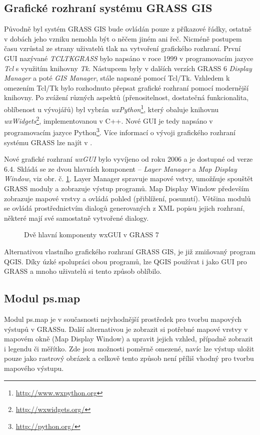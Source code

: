 \documentclass[a4paper,12pt,draft]{article}
\begin{document}
{\subsection{Grafické rozhraní systému GRASS GIS}
Původně byl systém GRASS GIS bude ovládán pouze z příkazové
řádky, ostatně v dobách jeho vzniku nemohla být o něčem jiném ani
řeč. Nicméně postupem času vzrůstal ze strany uživatelů tlak na
vytvoření grafického rozhraní. První GUI nazývané \emph{TCLTKGRASS}
bylo napsáno v roce 1999 v programovacím jazyce \emph{Tcl} s využitím
knihovny \emph{Tk}. Nástupcem byly v dalších verzích GRASS 6 \emph{Display
Manager} a poté \emph{GIS Manager}, stále napsané pomocí Tcl/Tk. Vzhledem
k omezením Tcl/Tk bylo rozhodnuto přepsat grafické rozhraní pomocí
modernější knihovny. Po zvážení různých aspektů (přenositelnost,
dostatečná funkcionalita, oblíbenost u vývojářů) 
byl vybrán \emph{wxPython}\footnote{\url{http://www.wxpython.org}}, který
obaluje knihovnu \emph{wxWidgets}\footnote{\url{http://wxwidgets.org/}},
implementovanou v C++. Nové GUI je tedy napsáno v programovacím jazyce
Python\footnote{\url{http://python.org/}}.
Více informací o vývoji grafického rozhraní systému GRASS lze najít v
\cite{wxGUI_clanek}.

Nové grafické rozhraní \emph{wxGUI} bylo vyvíjeno od roku 2006 a je
dostupné od verze 6.4. Skládá se ze dvou hlavních komponent -- \emph{Layer
Manager} a \emph{Map Display Window}, viz obr. č. \ref{fig:wxgui}. Layer
Manager spravuje mapové vstvy, umožňuje spouštět GRASS moduly a zobrazuje
výstup programů. Map Display Window především zobrazuje mapové vrstvy
a ovládá pohled (přiblížení, posunutí). Většina modulů se ovládá
prostřednictvím dialogů generovaných z XML popisu jejich rozhraní,
některé mají své samostatně vytvořené dialogy.
\begin{figure}[h!]
\centering
{}
\quad
{}
\caption{Dvě hlavní komponenty wxGUI v GRASS 7\label{fig:wxgui}}

\end{figure}

Alternativou vlastního grafického rozhraní GRASS GIS, je již zmiňovaný
program QGIS. Díky úzké spolupráci obou programů, lze QGIS používat i jako GUI
pro GRASS a mnoho uživatelů si tento způsob oblíbilo.

\subsection{Modul ps.map}
\label{sec:psmap}
Modul ps.map je v současnosti nejvhodnější prostředek pro tvorbu
mapových výstupů v GRASSu. Další alternativou je zobrazit si potřebné
mapové vrstvy v mapovém okně (Map Display Window)  a upravit jejich vzhled,
případně zobrazit i legendu či měřítko. Zde jsou možnosti poměrně
omezené, navíc lze výstup uložit pouze jako rastrový obrázek a celkově
tento způsob není příliš vhodný pro tvorbu mapového výstupu.

}
\end{document}
